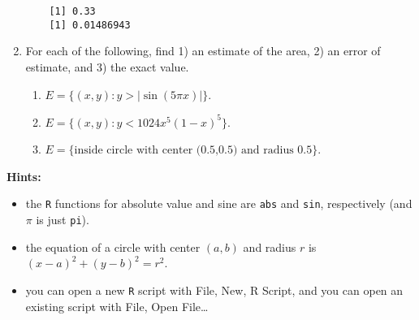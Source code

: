 \documentclass[10pt,english]{article}
\begin{document}
\begin{enumerate}
\begin{verbatim}
    [1] 0.33
    [1] 0.01486943
\end{verbatim}

\item For each of the following, find 1) an estimate of the area, 2) an error of estimate, and 3) the exact value.
\begin{enumerate}
\item \( E = \{ (x,y) : y > |\sin(5 \pi x)| \} \).
\item \( E = \{ (x,y) : y < 1024 x^5 (1-x)^5 \} \).
\item \( E = \{ \mbox{inside circle with center (0.5,0.5) and radius 0.5}\} \).
\end{enumerate}
\end{enumerate}
\textbf{Hints:}

\begin{itemize}
\item the \texttt{R} functions for absolute value and sine are \texttt{abs} and \texttt{sin}, respectively (and $\pi$ is just \texttt{pi}).
\item the equation of a circle with center \( (a,b) \) and radius $r$ is \( (x-a)^{2} + (y-b)^{2} = r^{2} \).
\item you can open a new \texttt{R} script with File, New, R Script, and you can open an existing script with File, Open File\ldots{}
\end{itemize}
\end{document}

